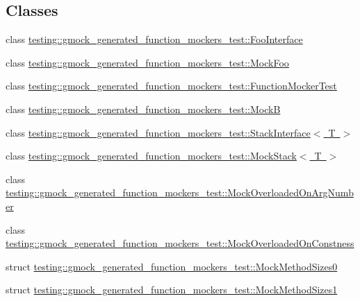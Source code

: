 \subsection*{Classes}
\begin{DoxyCompactItemize}
\item 
class \mbox{\hyperlink{classtesting_1_1gmock__generated__function__mockers__test_1_1_foo_interface}{testing\+::gmock\+\_\+generated\+\_\+function\+\_\+mockers\+\_\+test\+::\+Foo\+Interface}}
\item 
class \mbox{\hyperlink{classtesting_1_1gmock__generated__function__mockers__test_1_1_mock_foo}{testing\+::gmock\+\_\+generated\+\_\+function\+\_\+mockers\+\_\+test\+::\+Mock\+Foo}}
\item 
class \mbox{\hyperlink{classtesting_1_1gmock__generated__function__mockers__test_1_1_function_mocker_test}{testing\+::gmock\+\_\+generated\+\_\+function\+\_\+mockers\+\_\+test\+::\+Function\+Mocker\+Test}}
\item 
class \mbox{\hyperlink{classtesting_1_1gmock__generated__function__mockers__test_1_1_mock_b}{testing\+::gmock\+\_\+generated\+\_\+function\+\_\+mockers\+\_\+test\+::\+MockB}}
\item 
class \mbox{\hyperlink{classtesting_1_1gmock__generated__function__mockers__test_1_1_stack_interface}{testing\+::gmock\+\_\+generated\+\_\+function\+\_\+mockers\+\_\+test\+::\+Stack\+Interface$<$ T $>$}}
\item 
class \mbox{\hyperlink{classtesting_1_1gmock__generated__function__mockers__test_1_1_mock_stack}{testing\+::gmock\+\_\+generated\+\_\+function\+\_\+mockers\+\_\+test\+::\+Mock\+Stack$<$ T $>$}}
\item 
class \mbox{\hyperlink{classtesting_1_1gmock__generated__function__mockers__test_1_1_mock_overloaded_on_arg_number}{testing\+::gmock\+\_\+generated\+\_\+function\+\_\+mockers\+\_\+test\+::\+Mock\+Overloaded\+On\+Arg\+Number}}
\item 
class \mbox{\hyperlink{classtesting_1_1gmock__generated__function__mockers__test_1_1_mock_overloaded_on_constness}{testing\+::gmock\+\_\+generated\+\_\+function\+\_\+mockers\+\_\+test\+::\+Mock\+Overloaded\+On\+Constness}}
\item 
struct \mbox{\hyperlink{structtesting_1_1gmock__generated__function__mockers__test_1_1_mock_method_sizes0}{testing\+::gmock\+\_\+generated\+\_\+function\+\_\+mockers\+\_\+test\+::\+Mock\+Method\+Sizes0}}
\item 
struct \mbox{\hyperlink{structtesting_1_1gmock__generated__function__mockers__test_1_1_mock_method_sizes1}{testing\+::gmock\+\_\+generated\+\_\+function\+\_\+mockers\+\_\+test\+::\+Mock\+Method\+Sizes1}}

\end{DoxyCompactItemize}
